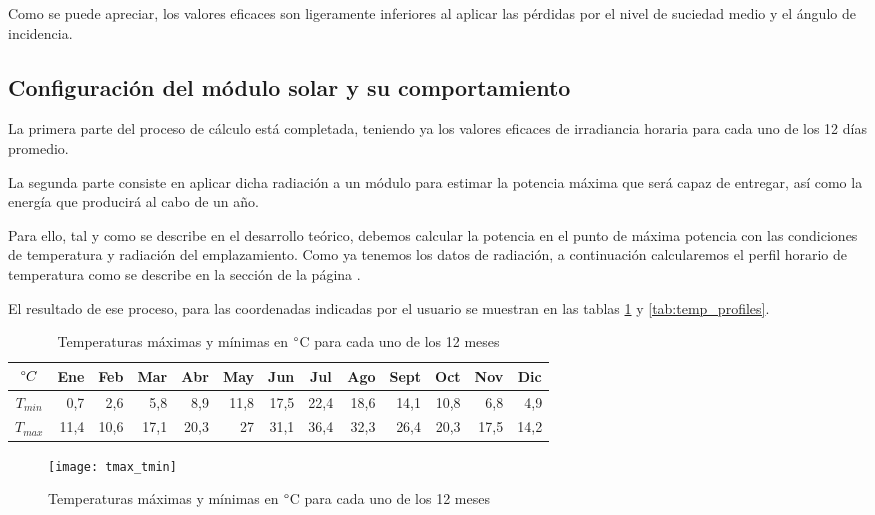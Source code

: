 Como se puede apreciar, los valores eficaces son ligeramente inferiores al aplicar las pérdidas por el nivel de suciedad medio y el ángulo de incidencia.

\subsection{Configuración del módulo solar y su comportamiento}

La primera parte del proceso de cálculo está completada, teniendo ya los valores eficaces de irradiancia horaria para cada uno de los 12 días promedio.

La segunda parte consiste en aplicar dicha radiación a un módulo para estimar la potencia máxima que será capaz de entregar, así como la energía que producirá al cabo de un año.

Para ello, tal y como se describe en el desarrollo teórico, debemos calcular la potencia en el punto de máxima potencia con las condiciones de temperatura y radiación del emplazamiento. Como ya tenemos los datos de radiación, a continuación calcularemos el perfil horario de temperatura como se describe en la sección de la página \pageref{section:term_behaviour}.

El resultado de ese proceso, para las coordenadas indicadas por el usuario se muestran en las tablas \ref{tab:temp_min_max} y \ref{tab:temp_profiles}.

\begin{table}[H]
\centering
\begin{tabular}{|c|r|r|r|r|r|r|r|r|r|r|r|r|}
\hline
$\degree C$ &
  \multicolumn{1}{c|}{Ene} &
  \multicolumn{1}{c|}{Feb} &
  \multicolumn{1}{c|}{Mar} &
  \multicolumn{1}{c|}{Abr} &
  \multicolumn{1}{c|}{May} &
  \multicolumn{1}{c|}{Jun} &
  \multicolumn{1}{c|}{Jul} &
  \multicolumn{1}{c|}{Ago} &
  \multicolumn{1}{c|}{Sept} &
  \multicolumn{1}{c|}{Oct} &
  \multicolumn{1}{c|}{Nov} &
  \multicolumn{1}{c|}{Dic} \\ \hline
$T_{min}$ & 0,7 & 2,6 & 5,8 & 8,9 & 11,8 & 17,5 & 22,4 & 18,6 & 14,1 & 10,8 & 6,8 & 4,9 \\ \hline
$T_{max}$ & 11,4 & 10,6 & 17,1 & 20,3 & 27 & 31,1 & 36,4 & 32,3 & 26,4 & 20,3 & 17,5 & 14,2 \\ \hline
\end{tabular}
\caption{Temperaturas máximas y mínimas en $\degree$C para cada uno de los 12 meses \label{tab:temp_min_max}}
\end{table}

\begin{figure}[H]
\texttt{[image: tmax\_tmin]}
\centering
\caption{Temperaturas máximas y mínimas en $\degree$C para cada uno de los 12 meses}
\label{fig:temp_min_max}
\end{figure}


